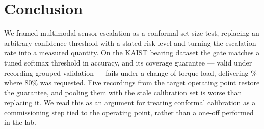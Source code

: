 \documentclass[conference,10pt]{IEEEtran}          %
\begin{document}
\section{Conclusion}
We framed multimodal sensor escalation as a conformal set-size test,
replacing an arbitrary confidence threshold with a stated risk level and
turning the escalation rate into a measured quantity. On the KAIST bearing
dataset the gate matches a tuned softmax threshold in accuracy, and its
coverage guarantee --- valid under recording-grouped validation --- fails
under a change of torque load, delivering \covEighty\% where 80\% was
requested. Five recordings from the target operating point restore the
guarantee, and pooling them with the stale calibration set is worse than
replacing it. We read this as an argument for treating conformal
calibration as a commissioning step tied to the operating point, rather
than a one-off performed in the lab.


\end{document}
